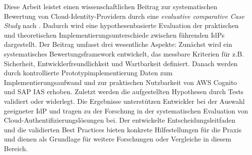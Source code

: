 Diese Arbeit leistet einen wissenschaftlichen Beitrag zur systematischen Bewertung von Cloud-Identity-Providern durch eine \textit{evaluative comparative Case Study} nach \citep{Kitchenham1995}. Dadurch wird eine hypothesenbasierte Evaluation der praktischen und theoretischen Implementierungsunterschiede zwischen führenden \ac{IdP}s dargestellt.
\newline
Der Beitrag umfasst drei wesentliche Aspekte: Zunächst wird ein systematisches Bewertungsframework entwickelt, das messbare Kriterien für z.B. Sicherheit, Entwicklerfreundlichkeit und Wartbarkeit definiert. Danach werden durch kontrollierte Prototypimplementierung Daten zum Implementierungsaufwand und zur praktischen Nutzbarkeit von AWS Cognito und \ac{SAP IAS} erhoben. Zuletzt werden die aufgestellten Hypothesen durch Tests validiert oder widerlegt.
\newline
Die Ergebnisse unterstützen Entwickler bei der Auswahl geeigneter \ac{IdP} und tragen zu der Forschung in der systematischen Evaluation von Cloud-\newline Authentifizierungslösungen bei. Der entwickelte Entscheidungsleitfaden und die validierten Best Practices bieten konkrete Hilfestellungen für die Praxis und dienen als Grundlage für weitere Forschungen oder Vergleiche in diesem Bereich.


